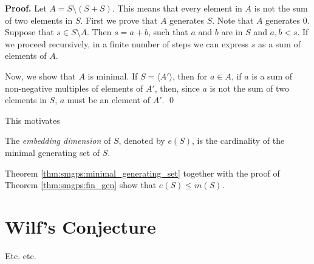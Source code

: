 \textbf{Proof. } Let $A = S \setminus(S + S)$. This means that every element in $A$ is not the sum of two elements in $S$. First we prove that $A$ generates $S$. Note that $A$ generates 0. Suppose that $s\in S \setminus A$. Then $s = a + b$, such that $a$ and $b$ are in $S$ and $a, b < s$. If we proceed recursively, in a finite number of steps we can express $s$ as a sum of elements of $A$. \par

Now, we show that $A$ is minimal. If $S = \langle A' \rangle$, then for $a \in A$, if $a$ is a sum of non-negative multiples of elements of $A'$, then, since $a$ is not the sum of two elements in $S$, $a$ must be an element of $A'$. \qed \par

This motivates \par

\begin{definition}\label{def:smgps:embedding_dim}
    The \textit{embedding dimension} of $S$, denoted by $e(S)$, is the cardinality of the minimal generating set of $S$.
\end{definition}

Theorem \ref{thm:smgps:minimal_generating_set} together with the proof of Theorem \ref{thm:smgps:fin_gen} show that $e(S) \leq m(S)$. \par


\begin{definition}\label{def:smgps:aperyset}

\end{definition}


\begin{definition}\label{def:smgps:frobeniusnum}
\end{definition}


\begin{definition}\label{def:smgps:genus}
\end{definition}


\section{Wilf's Conjecture}\label{sec:smgps:theme2}

Etc. etc.
